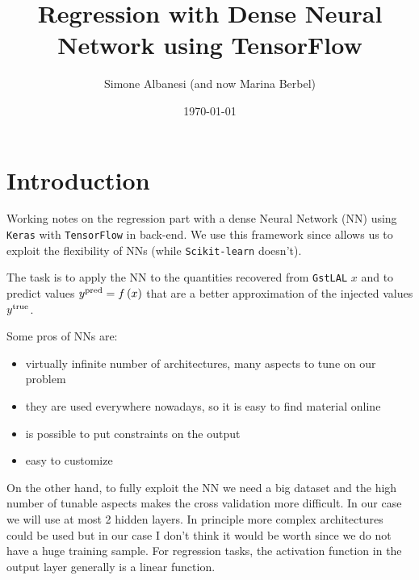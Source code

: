 \documentclass[prd,aps,twocolumn,a4paper,showkeys,nofootinbib]{article}
\begin{document}
\title{Regression with Dense Neural Network using TensorFlow}

\author{Simone Albanesi (and now Marina Berbel)}

\date{\today}

\maketitle

\section{Introduction}
Working notes on the regression part with a dense Neural Network (NN)
using \texttt{Keras} with \texttt{TensorFlow} in back-end. We use this framework since allows us to
exploit the flexibility of NNs (while \texttt{Scikit-learn} doesn't).

The task is to apply the NN to the quantities recovered from \texttt{GstLAL} $x$ and to predict
values $y^{\rm pred} = f\left( x \right)$ that are a better approximation of the injected 
values $y^{\rm true}$.

Some pros of NNs are:
\begin{itemize}
\item virtually infinite number of architectures, many aspects to tune on our problem 
\item they are used everywhere nowadays, so it is easy to find material online
\item is possible to put constraints on the output
\item easy to customize
\end{itemize}
On the other hand, to fully exploit the NN we need a big dataset and the high number of tunable
aspects makes the cross validation more difficult. In our case we will use at most 2 hidden layers.
In principle more complex architectures could  be used but in our case 
I don't think it would be worth since we do not have a huge training sample. 
For regression tasks, the activation function in the output layer generally is a linear function.
\end{document}
